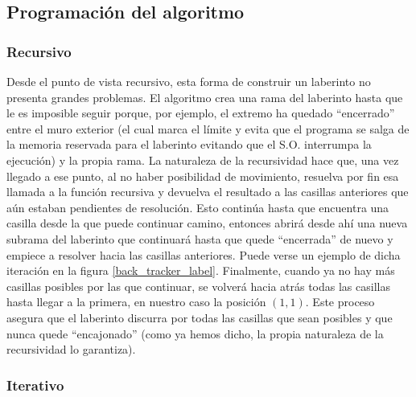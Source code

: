 \documentclass[12pt,a4paper]{article}
\begin{document}
\subsection{Programación del algoritmo}
\subsubsection{Recursivo}

Desde el punto de vista recursivo, esta forma de construir un laberinto no presenta grandes problemas. El algoritmo crea una rama del laberinto hasta que le es imposible seguir porque, por ejemplo, el extremo ha quedado ``encerrado'' entre el muro exterior (el cual marca el límite y evita que el programa se salga de la memoria reservada para el laberinto evitando que el S.O. interrumpa la ejecución) y la propia rama. La naturaleza de la recursividad hace que, una vez llegado a ese punto, al no haber posibilidad de movimiento, resuelva por fin esa llamada a la función recursiva y devuelva el resultado a las casillas anteriores que aún estaban pendientes de resolución.  Esto continúa hasta que encuentra una casilla desde la que puede continuar camino, entonces abrirá desde ahí una nueva subrama del laberinto que continuará hasta que quede ``encerrada'' de nuevo y empiece a resolver hacia las casillas anteriores. Puede verse un ejemplo de dicha iteración en la figura \ref{back_tracker_label}. Finalmente, cuando ya no hay más casillas posibles por las que continuar, se volverá hacia atrás todas las casillas hasta llegar a la primera, en nuestro caso la posición $(1,1)$. Este proceso asegura que el laberinto discurra por todas las casillas que sean posibles y que nunca quede ``encajonado'' (como ya hemos dicho, la propia naturaleza de la recursividad lo garantiza).

\subsubsection{Iterativo}
\end{document}
